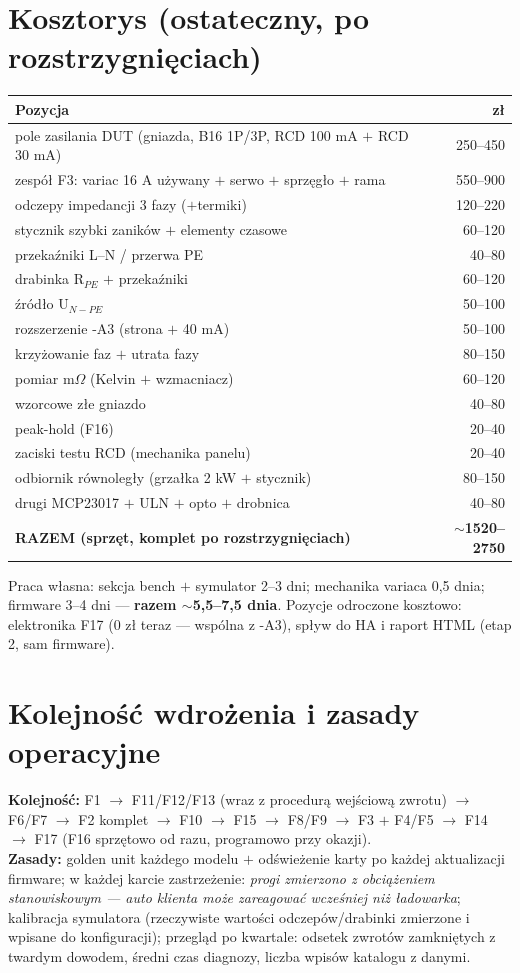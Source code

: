 \documentclass[11pt,a4paper]{article}
\newcommand{\ohm}{$\Omega$}
\begin{document}
\section{Kosztorys (ostateczny, po rozstrzygnięciach)}
\begin{longtable}{@{}p{}r@{}}
\toprule
\textbf{Pozycja} & \textbf{zł}\\
\midrule
pole zasilania DUT (gniazda, B16 1P/3P, RCD 100 mA $+$ RCD 30 mA) & 250--450\\
zespół F3: variac 16 A używany $+$ serwo $+$ sprzęgło $+$ rama & 550--900\\
odczepy impedancji 3 fazy ($+$termiki) & 120--220\\
stycznik szybki zaników $+$ elementy czasowe & 60--120\\
przekaźniki L--N / przerwa PE & 40--80\\
drabinka R$_{PE}$ $+$ przekaźniki & 60--120\\
źródło U$_{N-PE}$ & 50--100\\
rozszerzenie -A3 (strona $+$ 40 mA) & 50--100\\
krzyżowanie faz $+$ utrata fazy & 80--150\\
pomiar m\ohm{} (Kelvin $+$ wzmacniacz) & 60--120\\
wzorcowe złe gniazdo & 40--80\\
peak-hold (F16) & 20--40\\
zaciski testu RCD (mechanika panelu) & 20--40\\
odbiornik równoległy (grzałka 2 kW $+$ stycznik) & 80--150\\
drugi MCP23017 $+$ ULN $+$ opto $+$ drobnica & 40--80\\
\midrule
\textbf{RAZEM (sprzęt, komplet po rozstrzygnięciach)} & \textbf{$\sim$1520--2750}\\
\bottomrule
\end{longtable}
Praca własna: sekcja bench $+$ symulator 2--3 dni; mechanika variaca 0,5 dnia; firmware 3--4 dni
--- \textbf{razem $\sim$5,5--7,5 dnia}. Pozycje odroczone kosztowo: elektronika F17 (0 zł teraz
--- wspólna z -A3), spływ do HA i raport HTML (etap 2, sam firmware).

\section{Kolejność wdrożenia i zasady operacyjne}
\textbf{Kolejność:} F1 $\to$ F11/F12/F13 (wraz z procedurą wejściową zwrotu) $\to$ F6/F7 $\to$
F2 komplet $\to$ F10 $\to$ F15 $\to$ F8/F9 $\to$ F3 $+$ F4/F5 $\to$ F14 $\to$ F17 (F16 sprzętowo
od razu, programowo przy okazji).\\
\textbf{Zasady:} golden unit każdego modelu $+$ odświeżenie karty po każdej aktualizacji
firmware; w każdej karcie zastrzeżenie: \emph{progi zmierzono z obciążeniem stanowiskowym ---
auto klienta może zareagować wcześniej niż ładowarka}; kalibracja symulatora (rzeczywiste
wartości odczepów/drabinki zmierzone i wpisane do konfiguracji); przegląd po kwartale: odsetek
zwrotów zamkniętych z twardym dowodem, średni czas diagnozy, liczba wpisów katalogu z danymi.
\end{document}
